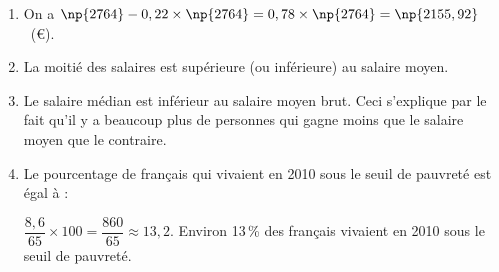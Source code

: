 
\medskip

%
%
%
%
%

\begin{enumerate}
\item %

On a $\np{2764} - 0,22\times \np{2764} = 0,78 \times \np{2764} = \np{2155,92}$~(\euro).
\item %
La moitié des salaires est supérieure (ou inférieure) au salaire moyen. 
\item %
Le salaire médian est inférieur au salaire moyen brut. Ceci s'explique par le fait qu'il y a beaucoup plus de personnes qui gagne moins que le salaire moyen que le contraire.
\item %
Le pourcentage de français qui vivaient en 2010 sous le seuil de pauvreté est égal à :

$\dfrac{8,6}{65}\times 100 = \dfrac{860}{65} \approx 13,2$. Environ 13\,\% des français  vivaient en 2010 sous le seuil de pauvreté.
\end{enumerate}

\bigskip

